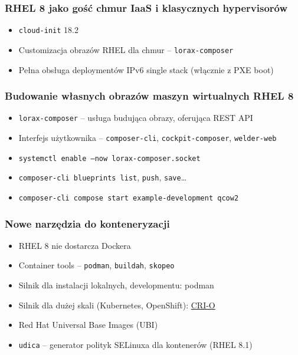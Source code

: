 \documentclass[dvipsnames,table]{beamer}
\begin{document}
\begin{frame}
	\frametitle{RHEL 8 jako gość chmur IaaS i klasycznych hypervisorów}
\begin{itemize}
	\item {\tt cloud-init} 18.2
	\item Customizacja obrazów RHEL dla chmur -- {\tt lorax-composer}
	\item Pełna obsługa deploymentów IPv6 single stack (włącznie z PXE boot)
\end{itemize}
\end{frame}

\begin{frame}
	\frametitle{Budowanie własnych obrazów maszyn wirtualnych RHEL 8}
	\begin{itemize}
		\item {\tt lorax-composer} -- usługa budująca obrazy, oferująca REST API
		\item Interfejs użytkownika -- {\tt composer-cli}, {\tt cockpit-composer}, {\tt welder-web}
		\item {\tt systemctl enable --now lorax-composer.socket}
		\item {\tt composer-cli blueprints list}, {\tt push}, {\tt save}\ldots
		\item {\tt composer-cli compose start example-development qcow2}	\end{itemize}

\end{frame}

\begin{frame}
	\frametitle{Nowe narzędzia do konteneryzacji}
\begin{itemize}
	\item RHEL 8 nie dostarcza Dockera
	\item Container tools -- {\tt podman}, {\tt buildah}, {\tt skopeo}
	\item Silnik dla instalacji lokalnych, developmentu: podman
	\item Silnik dla dużej skali (Kubernetes, OpenShift): \href{https://cri-o.io/}{CRI-O}
	\item Red Hat Universal Base Images (UBI)
	\item {\tt udica} -- generator polityk SELinuxa dla kontenerów (RHEL 8.1)
\end{itemize}
\end{frame}
\end{document}
